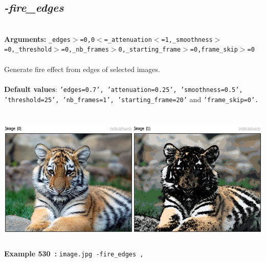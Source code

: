 \documentclass[a4paper,11pt,twoside]{book}
\begin{document}
\subsection{\emph{-fire\_edges} }\vspace*{-0.5em}
~\\\textbf{Arguments: } 
{\small \texttt{\_edges$>$=0,0$<$=\_attenuation$<$=1,\_smoothness$>$=0,\_threshold$>$=0,\_nb\_frames$>$0,\_starting\_frame$>$=0,frame\_skip$>$=0}}\\~\\
Generate fire effect from edges of selected images.
~\\~\\\textbf{Default values}: {\small \texttt{'edges=0.7', 'attenuation=0.25', 'smoothness=0.5', 'threshold=25', 'nb\_frames=1', 'starting\_frame=20'} and \texttt{'frame\_skip=0'.}}
\begin{center}\includegraphics[keepaspectratio=true,height=7cm,width=\textwidth]{img/gmic_def530.jpg}\\
{\footnotesize \textbf{Example 530~:} \texttt{image.jpg -fire\_edges ,}}
\end{center}
\end{document}
